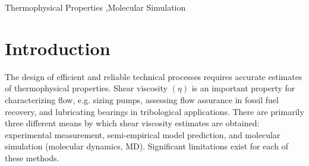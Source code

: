 \documentclass[preprint,review,12pt]{elsarticle}
\begin{document}
\begin{frontmatter}
\begin{abstract}
			
		\end{abstract}
		
		\begin{keyword}
			
			
			
			Thermophysical Properties \sep Molecular Simulation
			
		\end{keyword}
		
	\end{frontmatter}	
	
%	
%	
%	
%	
%	
	
	\section{Introduction}
	
	The design of efficient and reliable technical processes requires accurate estimates of thermophysical properties. Shear viscosity $(\eta)$ is an important property for characterizing flow, e.g. sizing pumps, assessing flow assurance in fossil fuel recovery, and lubricating bearings in tribological applications. There are primarily three different means by which shear viscosity estimates are obtained: experimental measurement, semi-empirical model prediction, and molecular simulation (molecular dynamics, MD). Significant limitations exist for each of these methods. 
	
\end{document}
